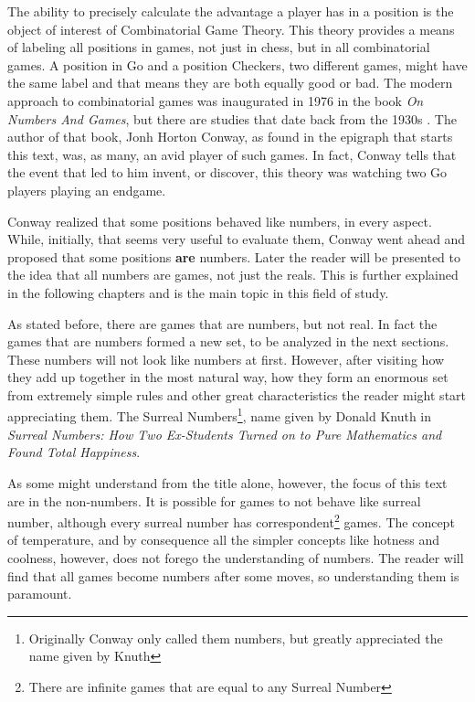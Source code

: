 The ability to precisely calculate the advantage a player has in a position is the object of interest of Combinatorial Game Theory. This theory provides a means of labeling all positions in games, not just in chess, but in all combinatorial games. A position in Go and a position Checkers, two different games, might have the same label and that means they are both equally good or bad. The modern approach to combinatorial games was inaugurated in 1976 in the book \textit{On Numbers And Games}, but there are studies that date back from the 1930s \cite{CGT}. The author of that book, Jonh Horton Conway, as found in the epigraph that starts this text, was, as many, an avid player of such games. In fact, Conway tells that the event that led to him invent, or discover, this theory was watching two Go players playing an endgame.

Conway realized that some positions behaved like numbers, in every aspect. While, initially, that seems very useful to evaluate them, Conway went ahead and proposed that some positions \textbf{are} numbers. Later the reader will be presented to the idea that all numbers are games, not just the reals. This  is further explained in the following chapters and is the main topic in this field of study.

As stated before, there are games that are numbers, but not real. In fact the games that are numbers formed a new set, to be analyzed in the next sections. These numbers will not look like numbers at first. However, after visiting how they add up together in the most natural way, how they form an enormous set from extremely simple rules and other great characteristics the reader might start appreciating them. The Surreal Numbers\footnote{Originally Conway only called them numbers, but greatly appreciated the name given by Knuth}, name given by Donald Knuth in \textit{Surreal Numbers: How Two Ex-Students Turned on to Pure Mathematics and Found Total Happiness}.

As some might understand from the title alone, however, the focus of this text are in the non-numbers. It is possible for games to not behave like surreal number, although every surreal number has correspondent\footnote{There are infinite games that are equal to any Surreal Number} games. The concept of temperature, and by consequence all the simpler concepts like hotness and coolness, however, does not forego the understanding of numbers. The reader will find that all games become numbers after some moves, so understanding them is paramount.

